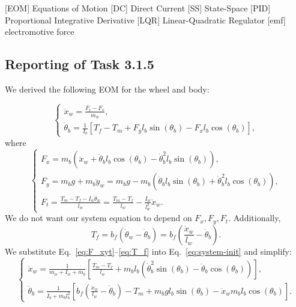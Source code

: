 \documentclass[11pt]{article} %
\begin{document}
\begin{acronym}[TDMA]
		[EOM]	{Equations of Motion}
		[DC]	{Direct Current}
		[SS]	{State-Space}
		[PID]	{Proportional Integrative Derivative}
		[LQR]	{Linear-Quadratic Regulator}
		[emf]	{electromotive force}
\end{acronym}

\subsection*{Reporting of Task 3.1.5}
We derived the following \ac{EOM} for the wheel and body:

\begin{equation}\label{eq:system-init}
  \begin{cases}
    \ddot{x}_w = \frac{F_t - F_x}{m_w}, \\[1em]
    \ddot{\theta}_b =
    \frac{1}{I_b}\left[
      T_f
      - T_m
      + F_y l_b \sin(\theta_b)
      - F_x l_b \cos(\theta_b)
    \right],
  \end{cases}
\end{equation}
where
\begin{equation}\label{eq:F_xyt}
  \begin{cases}
    F_x = m_b\left(
      \ddot{x}_w
      + \ddot{\theta}_b l_b \cos(\theta_b)
      - \dot{\theta}^2_b l_b \sin(\theta_b)
    \right), \\[1em]
    F_y = m_b g+ m_b \ddot{y}_w = m_b g - m_b\left(
      \ddot{\theta}_b l_b \sin(\theta_b)
      + \dot{\theta}^2_b l_b \cos(\theta_b)
    \right), \\[1em]
    F_t = \frac{T_m - T_f - I_w \ddot{\theta}_w}{l_w} = \frac{T_m - T_f}{l_w} - \frac{I_w}{l^2_w} \ddot{x}_w.
  \end{cases}
\end{equation}
We do not want our system equation to depend on $F_x, F_y, F_t$.
Additionally,
\begin{equation}\label{eq:T_f}
T_f = b_f\left(
\dot{\theta}_w - \dot{\theta}_b
\right) =
b_f\left(
\frac{\dot{x}_w}{l_w} - \dot{\theta}_b
\right).
\end{equation}
We substitute Eq.~\eqref{eq:F_xyt}--\eqref{eq:T_f} into Eq.~\eqref{eq:system-init} and simplify:
\begin{equation}\label{eq:system}
  \begin{cases}
    \ddot{x}_w = \frac{1}{m_w + I_w + m_b}\left[
      \frac{T_m - T_f}{l_w}
      + m_b l_b \left(\dot{\theta}^2_b \sin(\theta_b)
        - \ddot{\theta}_b \cos(\theta_b)
      \right)
    \right], \\[1em]
    \ddot{\theta}_b = \frac{1}{I_b + m_b l_b^2}\left[
      b_f\left(\frac{\dot{x}_w}{l_w}
        - \dot{\theta}_b\right)
      - T_m
      + m_b g l_b \sin(\theta_b)
      - \ddot{x}_w m_b l_b \cos(\theta_b)
    \right].
  \end{cases}
\end{equation}
\end{document}
